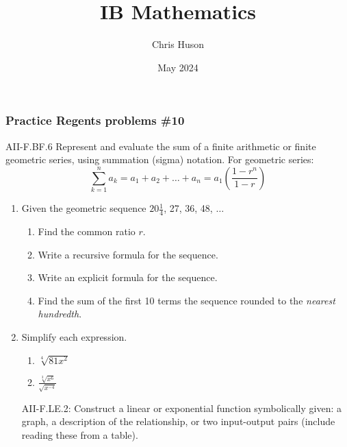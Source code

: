 \documentclass[12pt, twoside]{article}
\title{IB Mathematics}
\author{Chris Huson}
\date{May 2024}
\begin{document}
\subsubsection*{Practice Regents problems \#10}
AII-F.BF.6 Represent and evaluate the sum of a finite arithmetic
or finite geometric series, using summation (sigma) notation. For geometric series:
$$\sum_{k=1}^{n} a_k = a_1 + a_2 + \ldots + a_n = a_1 \left( \frac{1-r^n}{1-r} \right)$$

\begin{enumerate}
\item Given the geometric sequence $20 \frac{1}{4}$, 27, 36, 48, $\ldots$
\begin{enumerate}[itemsep=2cm]
    \item Find the common ratio $r$.
    \item Write a recursive formula for the sequence.
    \item Write an explicit formula for the sequence.
    \item Find the sum of the first 10 terms the sequence rounded to the \emph{nearest hundredth}.
\end{enumerate} \vspace{3cm}


\item Simplify each expression. 
\begin{multicols}{2}
    \begin{enumerate}
        \item $\sqrt[4]{81x^2}$
        \item $\displaystyle \frac{\sqrt[3]{x^{6}}}{\sqrt{x^{-4}}}$
    \end{enumerate}
\end{multicols}
\vspace{2cm}

\newpage
AII-F.LE.2: Construct a linear or exponential function symbolically given: a graph, a description of the relationship, or two input-output pairs (include reading these from a table).


\end{enumerate}
\end{document}
